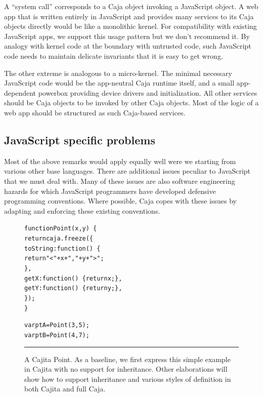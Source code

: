 \documentclass[letterpaper,twocolumn,10pt]{article}
\begin{document}
A ``system call'' corresponds to a Caja object invoking a JavaScript object. 
A web app that is written entirely in JavaScript and provides many services 
to its Caja objects directly would be like a monolithic kernel. For 
compatibility with existing JavaScript apps, we support this usage pattern 
but we don't recommend it. By analogy with kernel code at the boundary with 
untrusted code, such JavaScript code needs to maintain delicate invariants 
that it is easy to get wrong.

The other extreme is analogous to a micro-kernel. The minimal necessary 
JavaScript code would be the app-neutral Caja runtime itself, and a small 
app-dependent powerbox providing device drivers and initialization. All other 
services should be Caja objects to be invoked by other Caja objects. Most 
of the logic of a web app should be structured as such Caja-based services.

\subsection{JavaScript specific problems}
\label{subsec:js-probs}

Most of the above remarks would apply equally well were we starting from 
various other base languages. There are additional issues peculiar to 
JavaScript that we must deal with. Many of these issues are also software 
engineering hazards for which JavaScript programmers have developed 
defensive programming conventions. Where possible, Caja copes with these 
issues by adapting and enforcing these existing conventions.

\begin{figure}[t!]
\begin{alltt}
function Point(x, y)\ \{
  return caja.freeze(\{
    toString: function()\ \{ 
      return "<" + x + "," + y + ">"; 
    \},
    getX: function()\ \{ return x; \},
    getY: function()\ \{ return y; \},
  \});
\}

var ptA = Point(3, 5);
var ptB = Point(4, 7);
\end{alltt}

\caption[A Cajita Point.]{A Cajita Point. As a baseline, we first express 
this simple example in Cajita with no support for inheritance. Other 
elaborations will show how to support inheritance and various styles of 
definition in both Cajita and full Caja. 
\\ } \hrule
\label{fig:cajita-point}
\end{figure}
\end{document}
